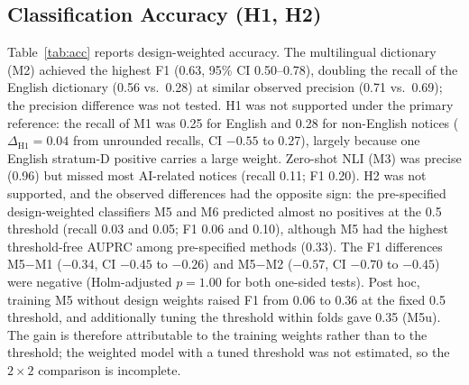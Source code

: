 \documentclass[runningheads]{llncs}
\begin{document}
\subsection{Classification Accuracy (H1, H2)}
Table~\ref{tab:acc} reports design-weighted accuracy. The multilingual dictionary (M2) achieved the highest F1 (0.63, 95\% CI 0.50--0.78), doubling the recall of the English dictionary (0.56 vs.\ 0.28) at similar observed precision (0.71 vs.\ 0.69); the precision difference was not tested. H1 was not supported under the primary reference: the recall of M1 was 0.25 for English and 0.28 for non-English notices ($\Delta_{\mathrm{H1}}=0.04$ from unrounded recalls, CI $-0.55$ to 0.27), largely because one English stratum-D positive carries a large weight. Zero-shot NLI (M3) was precise (0.96) but missed most AI-related notices (recall 0.11; F1 0.20). H2 was not supported, and the observed differences had the opposite sign: the pre-specified design-weighted classifiers M5 and M6 predicted almost no positives at the 0.5 threshold (recall 0.03 and 0.05; F1 0.06 and 0.10), although M5 had the highest threshold-free AUPRC among pre-specified methods (0.33). The F1 differences M5$-$M1 ($-0.34$, CI $-0.45$ to $-0.26$) and M5$-$M2 ($-0.57$, CI $-0.70$ to $-0.45$) were negative (Holm-adjusted $p=1.00$ for both one-sided tests). Post hoc, training M5 without design weights raised F1 from 0.06 to 0.36 at the fixed 0.5 threshold, and additionally tuning the threshold within folds gave 0.35 (M5u). The gain is therefore attributable to the training weights rather than to the threshold; the weighted model with a tuned threshold was not estimated, so the $2\times2$ comparison is incomplete.
\end{document}

